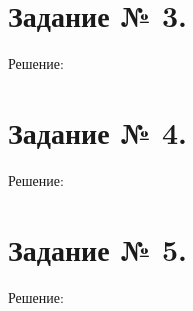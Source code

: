 \documentclass[fleqn]{article}
\begin{document}
\section*{Задание № 3.}

\begin{center}Решение:\end{center}

\section*{Задание № 4.}

\begin{center}Решение:\end{center}

\section*{Задание № 5.}

\begin{center}Решение:\end{center}


\begin{comment}
\end{comment}
\end{document}
